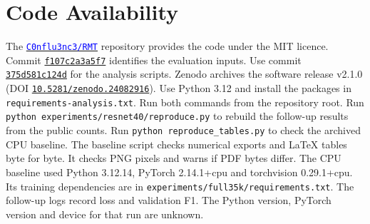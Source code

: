 \documentclass[11pt,a4paper]{article}
\newcommand{\repositorylink}{\href{https://github.com/C0nflu3nc3/RMT}{\mbox{\textcolor{blue}{\texttt{C0nflu3nc3/RMT}}}}}
\begin{document}
\section{Code Availability}
The \repositorylink{} repository provides the code under the MIT licence. Commit \href{https://github.com/C0nflu3nc3/RMT/commit/f107c2a3a5f70342654308baccb572bf04f454ed}{\texttt{f107c2a3a5f7}} identifies the evaluation inputs. Use commit \href{https://github.com/C0nflu3nc3/RMT/tree/375d581c124db19fc7dad40aa0d0f8a4cac52537}{\texttt{375d581c124d}} for the analysis scripts. Zenodo archives the software release v2.1.0 (DOI \href{https://doi.org/10.5281/zenodo.24082916}{\nolinkurl{10.5281/zenodo.24082916}}). Use Python 3.12 and install the packages in \nolinkurl{requirements-analysis.txt}. Run both commands from the repository root. Run \texttt{python experiments/resnet40/reproduce.py} to rebuild the follow-up results from the public counts. Run \texttt{python reproduce\_tables.py} to check the archived CPU baseline. The baseline script checks numerical exports and LaTeX tables byte for byte. It checks PNG pixels and warns if PDF bytes differ. The CPU baseline used Python 3.12.14, PyTorch 2.14.1+cpu and torchvision 0.29.1+cpu. Its training dependencies are in \nolinkurl{experiments/full35k/requirements.txt}. The follow-up logs record loss and validation F1. The Python version, PyTorch version and device for that run are unknown.
\FloatBarrier
\end{document}
